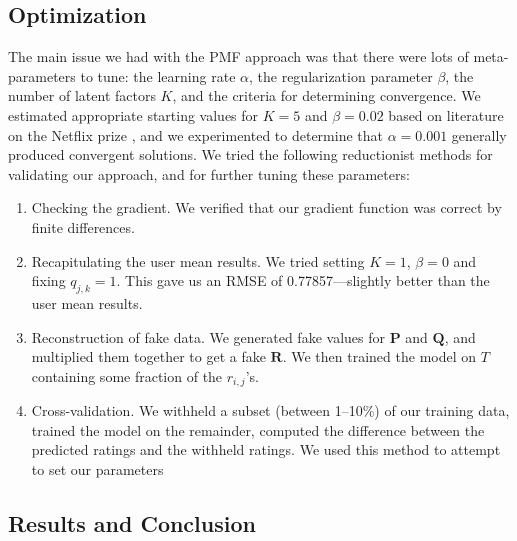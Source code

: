 \documentclass[11pt]{amsart}
\newcommand{\mat}[1]{\mathbf{#1}}
\begin{document}
\subsection{Optimization}
The main issue we had with the PMF approach was that there were lots of meta-parameters to tune: the learning rate $\alpha$, the regularization parameter $\beta$, the number of latent factors $K$, and the criteria for determining convergence. We estimated appropriate starting values for $K = 5$ and $\beta = 0.02$ based on literature on the Netflix prize \cite{Mnih:2007wg,Ott:2008tu}, and we experimented to determine that $\alpha = 0.001$ generally produced convergent solutions. We tried the following reductionist methods for validating our approach, and for further tuning these parameters:

\begin{enumerate}
\item Checking the gradient. We verified that our gradient function was correct by finite differences.
\item Recapitulating the user mean results. We tried setting $K=1$, $\beta=0$ and fixing $q_{j,k} = 1$. This gave us an RMSE of 0.77857---slightly better than the user mean results.
\item Reconstruction of fake data. We generated fake values for $\mat{P}$ and $\mat{Q}$, and multiplied them together to get a fake $\mat{R}$. We then trained the model on $T$ containing some fraction of the $r_{i,j}$'s.  
\item Cross-validation. We withheld a subset (between 1--10\%) of our training data, trained the model on the remainder, computed the difference between the predicted ratings and the withheld ratings. We used this method to attempt to set our parameters
 
\end{enumerate}

\subsection{Results and Conclusion}




\end{document}
